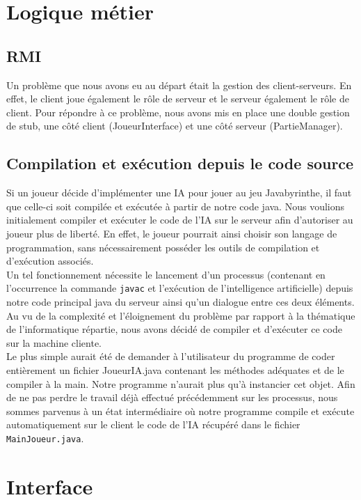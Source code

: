 \section{Logique métier}

    \subsection{RMI}
        Un problème que nous avons eu au départ était la gestion des client-serveurs. En effet, le client joue également le rôle de serveur et le serveur également le rôle de client. Pour répondre à ce problème, nous avons mis en place une double gestion de stub, une côté client (JoueurInterface) et une côté serveur (PartieManager).

    \subsection{Compilation et exécution depuis le code source}
	\label{problemes_IA}

        Si un joueur décide d'implémenter une IA pour jouer au jeu Javabyrinthe, il faut que celle-ci soit compilée et exécutée à partir de notre code java. Nous voulions initialement compiler et exécuter le code de l'IA sur le serveur afin d'autoriser au joueur plus de liberté. En effet, le joueur pourrait ainsi choisir son langage de programmation, sans nécessairement posséder les outils de compilation et d'exécution associés.\\

		Un tel fonctionnement nécessite le lancement d'un processus (contenant en l'occurrence la commande \texttt{javac} et l'exécution de l'intelligence artificielle) depuis notre code principal java du serveur ainsi qu'un dialogue entre ces deux éléments. Au vu de la complexité et l'éloignement du problème par rapport à la thématique de l'informatique répartie, nous avons décidé de compiler et d'exécuter ce code sur la machine cliente.\\

		Le plus simple aurait été de demander à l'utilisateur du programme de coder entièrement un fichier JoueurIA.java contenant les méthodes adéquates et de le compiler à la main. Notre programme n'aurait plus qu'à instancier cet objet. Afin de ne pas perdre le travail déjà effectué précédemment sur les processus, nous sommes parvenus à un état intermédiaire où notre programme compile et exécute automatiquement sur le client le code de l'IA récupéré dans le fichier \texttt{MainJoueur.java}.


\section{Interface}
